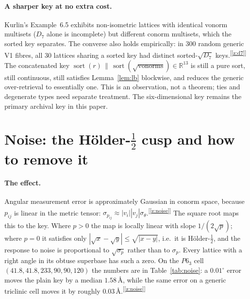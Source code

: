 \documentclass[11pt]{article}
\newcommand{\Ang}{\text{\AA}}
\newcommand{\chk}[1]{\textsuperscript{[\ref{#1}]}}
\begin{document}
\paragraph{A sharper key at no extra cost.}
Kurlin's Example~6.5 exhibits non-isometric lattices with identical vonorm multisets ($D_7$ alone is incomplete) but different conorm multisets, which the sorted key separates. The converse also holds empirically: in 300 random generic V1 fibres, all 30 lattices sharing a sorted key had distinct sorted-$\sqrt{D_7}$ keys.\chk{z:d7} The concatenated key $\operatorname{sort}(r)\,\|\,\operatorname{sort}(\sqrt{\text{vonorms}})\in\mathbb R^{13}$ is still a pure sort, still continuous, still satisfies Lemma~\ref{lem:lb} blockwise, and reduces the generic over-retrieval to essentially one. This is an observation, not a theorem; ties and degenerate types need separate treatment. The six-dimensional key remains the primary archival key in this paper.

\section{Noise: the H\"older-$\tfrac12$ cusp and how to remove it}
\label{app:noise}

\paragraph{The effect.}
Angular measurement error is approximately Gaussian in conorm space, because $p_{ij}$ is linear in the metric tensor: $\sigma_{p_{ij}}\approx|v_i||v_j|\sigma_\theta$.\chk{z:noise} The square root maps this to the key. Where $p>0$ the map is locally linear with slope $1/(2\sqrt p)$; where $p=0$ it satisfies only $|\sqrt x-\sqrt y|\le\sqrt{|x-y|}$, i.e.\ it is H\"older-$\tfrac12$, and the response to noise is proportional to $\sqrt{\sigma_p}$ rather than to $\sigma_p$. Every lattice with a right angle in its obtuse superbase has such a zero. On the $P6_3$ cell $(41.8,41.8,233,90,90,120)$ the numbers are in Table~\ref{tab:noise}: a $0.01^\circ$ error moves the plain key by a median $1.58\,\Ang$, while the same error on a generic triclinic cell moves it by roughly $0.03\,\Ang$.\chk{z:noise}
\end{document}
